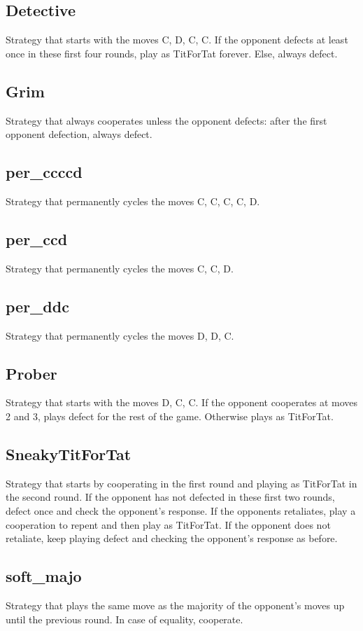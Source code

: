 \documentclass[12pt]{article}
\begin{document}
\subsection{Detective}
Strategy that starts with the moves C, D, C, C. If the opponent defects at least once in these first four rounds, play as TitForTat forever. Else, always defect.

\subsection{Grim}
Strategy that always cooperates unless the opponent defects: after the first opponent defection, always defect.

\subsection{per\_ccccd}
Strategy that permanently cycles the moves C, C, C, C, D.

\subsection{per\_ccd}
Strategy that permanently cycles the moves C, C, D.

\subsection{per\_ddc}
Strategy that permanently cycles the moves D, D, C.

\subsection{Prober}
Strategy that starts with the moves D, C, C. If the opponent cooperates at moves 2 and 3, plays defect for the rest of the game. Otherwise plays as TitForTat.

\subsection{SneakyTitForTat}
Strategy that starts by cooperating in the first round and playing as TitForTat in the second round. If the opponent has not defected in these first two rounds, defect once and check the opponent's response. If the opponents retaliates, play a cooperation to repent and then play as TitForTat. If the opponent does not retaliate, keep playing defect and checking the opponent's response as before.

\subsection{soft\_majo}
Strategy that plays the same move as the majority of the opponent's moves up until the previous round. In case of equality, cooperate.
\end{document}
